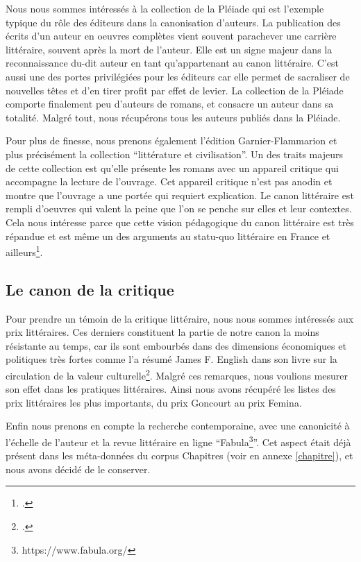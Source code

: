 Nous nous sommes intéressés à la collection de la Pléiade qui est l'exemple typique du rôle des éditeurs dans la canonisation d'auteurs. La publication des écrits d'un auteur en oeuvres complètes vient souvent parachever une carrière littéraire, souvent après la mort de l'auteur. Elle est un signe majeur dans la reconnaissance du-dit auteur en tant qu'appartenant au canon littéraire. C'est aussi une des portes privilégiées pour les éditeurs car elle permet de sacraliser de nouvelles têtes et d'en tirer profit par effet de levier. La collection de la Pléiade comporte finalement peu d'auteurs de romans, et consacre un auteur dans sa totalité. Malgré tout, nous récupérons tous les auteurs publiés dans la Pléiade.


Pour plus de finesse, nous prenons également l'édition Garnier-Flammarion et plus précisément la collection \enquote{littérature et civilisation}. Un des traits majeurs de cette collection est qu'elle présente les romans avec un appareil critique qui accompagne la lecture de l'ouvrage. Cet appareil critique n'est pas anodin et montre que l'ouvrage a une portée qui requiert explication. Le canon littéraire est rempli d'oeuvres qui valent la peine que l'on se penche sur elles et leur contextes. Cela nous intéresse parce que cette vision pédagogique du canon littéraire est très répandue et est même un des arguments au statu-quo littéraire en France et ailleurs\footcites{guillory_cultural_1998}.  

\subsection{Le canon de la critique}
Pour prendre un témoin de la critique littéraire, nous nous sommes intéressés aux prix littéraires. Ces derniers constituent la partie de notre canon la moins résistante au temps, car ils sont embourbés dans des dimensions économiques et politiques très fortes comme l'a résumé James F. English dans son livre sur la circulation de la valeur culturelle\footcites{english_economy_2009}. Malgré ces remarques, nous voulions mesurer son effet dans les pratiques littéraires. Ainsi nous avons récupéré les listes des prix littéraires les plus importants, du prix Goncourt au prix Femina. 

Enfin nous prenons en compte la recherche contemporaine, avec une canonicité à l'échelle de l'auteur et la revue littéraire en ligne \enquote{Fabula\footnote{https://www.fabula.org/}}. Cet aspect était déjà présent dans les méta-données du corpus Chapitres (voir en annexe \ref{chapitre}), et nous avons décidé de le conserver. 

